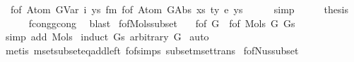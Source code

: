 \begin{isabellebody}
\ {\isachardoublequoteopen}{\isasymnot}\ f{\isacharunderscore}{\kern0pt}of\ {\isacharparenleft}{\kern0pt}Atom\ {\isacharparenleft}{\kern0pt}GVar\ i{\isacharparenright}{\kern0pt}\ ys{\isacharprime}{\kern0pt}{\isacharparenright}{\kern0pt}\ {\isasymsimeq}fm\ f{\isacharunderscore}{\kern0pt}of\ {\isacharparenleft}{\kern0pt}Atom\ {\isacharparenleft}{\kern0pt}GAbs\ xs\ ty{}\ e{\isacharparenright}{\kern0pt}\ ys{\isacharparenright}{\kern0pt}{\isachardoublequoteclose}\isanewline
\ \ \ \ \isamarkupfalse%
\ simp\isanewline
\ \ \isamarkupfalse%
\ \isamarkupfalse%
\ {\isacharquery}{\kern0pt}thesis\isanewline
\ \ \ \ \isamarkupfalse%
\ f{\isacharunderscore}{\kern0pt}cong{\isacharunderscore}{\kern0pt}gcong\ \isamarkupfalse%
\ blast\isanewline
{}\isamarkupfalse%
%
\endisatagproof
{\isafoldproof}%
%
\isadelimproof
\isanewline
%
\endisadelimproof
\isanewline
\isanewline
\isanewline
\isanewline
{}\isamarkupfalse%
\ f{\isacharunderscore}{\kern0pt}of{\isacharunderscore}{\kern0pt}Mols{\isacharunderscore}{\kern0pt}subset{\isacharcolon}{\kern0pt}\isanewline
\ \ \ {\isachardoublequoteopen}f{\isacharunderscore}{\kern0pt}of\ G\ {\isasymsubseteq}{\isacharhash}{\kern0pt}\ f{\isacharunderscore}{\kern0pt}of\ {\isacharparenleft}{\kern0pt}Mols{}\ G\ Gs{\isacharparenright}{\kern0pt}{\isachardoublequoteclose}\isanewline
%
\isadelimproof
%
\endisadelimproof
%
\isatagproof
{}\isamarkupfalse%
\ {\isacharparenleft}{\kern0pt}simp\ add{\isacharcolon}{\kern0pt}\ Mols{}{\isacharparenright}{\kern0pt}\isanewline
{}\isamarkupfalse%
\ {\isacharparenleft}{\kern0pt}induct\ Gs\ arbitrary{\isacharcolon}{\kern0pt}\ G{\isacharparenright}{\kern0pt}\isanewline
{}\isamarkupfalse%
\ auto\isanewline
{}\isamarkupfalse%
\ {\isacharparenleft}{\kern0pt}metis\ mset{\isacharunderscore}{\kern0pt}subset{\isacharunderscore}{\kern0pt}eq{\isacharunderscore}{\kern0pt}add{\isacharunderscore}{\kern0pt}left\ f{\isacharunderscore}{\kern0pt}of{\isachardot}{\kern0pt}simps{\isacharparenleft}{\kern0pt}{}{\isacharparenright}{\kern0pt}\ subset{\isacharunderscore}{\kern0pt}mset{\isachardot}{\kern0pt}trans{\isacharparenright}{\kern0pt}%
\endisatagproof
{\isafoldproof}%
%
\isadelimproof
\isanewline
%
\endisadelimproof
\isanewline
{}\isamarkupfalse%
\ f{\isacharunderscore}{\kern0pt}of{\isacharunderscore}{\kern0pt}Nus{\isacharunderscore}{\kern0pt}subset{\isacharcolon}{\kern0pt}\isanewline

\end{isabellebody}
